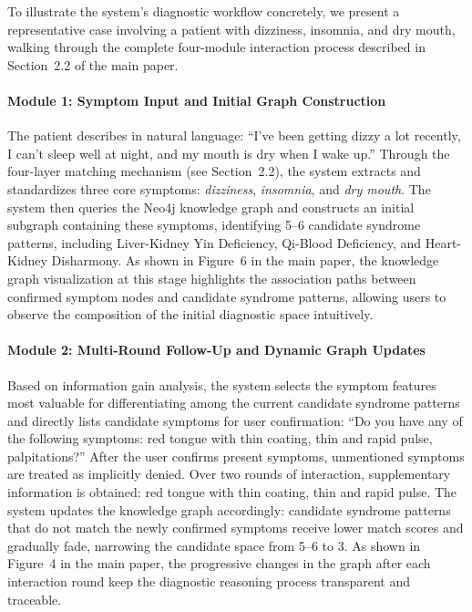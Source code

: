 \documentclass[12pt]{article}
\begin{document}
To illustrate the system's diagnostic workflow concretely, we present a representative case involving a patient with dizziness, insomnia, and dry mouth,
walking through the complete four-module interaction process described in Section~2.2 of the main paper.

\paragraph{Module 1: Symptom Input and Initial Graph Construction}
The patient describes in natural language: ``I've been getting dizzy a lot recently, I can't sleep well at night, and my mouth is dry when I wake up.''
Through the four-layer matching mechanism (see Section~2.2), the system extracts and standardizes three core symptoms: \textit{dizziness}, \textit{insomnia}, and \textit{dry mouth}.
The system then queries the Neo4j knowledge graph and constructs an initial subgraph containing these symptoms, identifying 5--6 candidate syndrome patterns,
including Liver-Kidney Yin Deficiency, Qi-Blood Deficiency, and Heart-Kidney Disharmony.
As shown in Figure~6 in the main paper, the knowledge graph visualization at this stage highlights the association paths between confirmed symptom nodes and candidate syndrome patterns,
allowing users to observe the composition of the initial diagnostic space intuitively.

\paragraph{Module 2: Multi-Round Follow-Up and Dynamic Graph Updates}
Based on information gain analysis, the system selects the symptom features most valuable for differentiating among the current candidate syndrome patterns
and directly lists candidate symptoms for user confirmation: ``Do you have any of the following symptoms: red tongue with thin coating, thin and rapid pulse, palpitations?''
After the user confirms present symptoms, unmentioned symptoms are treated as implicitly denied.
Over two rounds of interaction, supplementary information is obtained: red tongue with thin coating, thin and rapid pulse.
The system updates the knowledge graph accordingly: candidate syndrome patterns that do not match the newly confirmed symptoms receive lower match scores and gradually fade,
narrowing the candidate space from 5--6 to 3. As shown in Figure~4 in the main paper,
the progressive changes in the graph after each interaction round keep the diagnostic reasoning process transparent and traceable.
\end{document}
